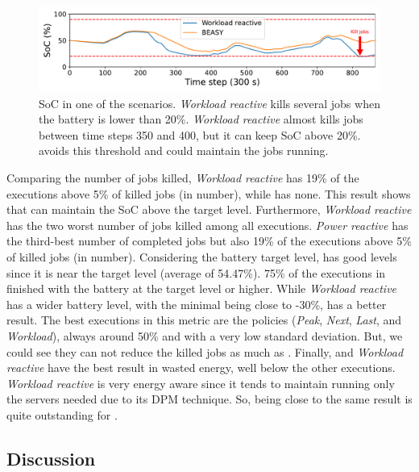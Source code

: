 \begin{figure}[!htb]
    \centering
    \includegraphics[scale=0.5]{Images/Heuristic/diff_state_of_charge.pdf}
    \caption{SoC in one of the scenarios. \emph{Workload reactive} kills several jobs when the battery is lower than 20\%. \emph{Workload reactive} almost kills jobs between time steps 350 and 400, but it can keep SoC above 20\%. \emph{\systemName} avoids this threshold and could maintain the jobs running.}
    \label{fig:soc_average}
\end{figure}

Comparing the number of jobs killed, \emph{Workload reactive} has 19\% of the executions above 5\% of killed jobs (in number), while \emph{\systemName} has none. This result shows that \emph{\systemName} can maintain the SoC above the target level. Furthermore, \emph{Workload reactive} has the two worst number of jobs killed among all executions. \emph{Power reactive} has the third-best number of completed jobs but also 19\% of the executions above 5\% of killed jobs (in number). Considering the battery target level, \emph{\systemName} has good levels since it is near the target level (average of 54.47\%). 75\% of the executions in \emph{\systemName} finished with the battery at the target level or higher. While \emph{Workload reactive} has a wider battery level, with the minimal being close to -30\%, \emph{\systemName} has a better result. The best executions in this metric are the policies (\emph{Peak}, \emph{Next}, \emph{Last}, and \emph{Workload}), always around 50\% and with a very low standard deviation. But, we could see they can not reduce the killed jobs as much as \emph{\systemName}. Finally, \emph{\systemName} and \emph{Workload reactive} have the best result in wasted energy, well below the other executions. \emph{Workload reactive} is very energy aware since it tends to maintain running only the servers needed due to its DPM technique. So, being close to the same result is quite outstanding for \emph{\systemName}. 

\subsection{Discussion}

